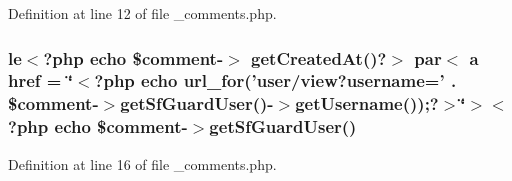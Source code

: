 Definition at line 12 of file \-\_\-comments.\-php.

\hypertarget{live_2modules_2comment_2templates_2__comments_8php_a4dd7f607c7b5683f1ebb8f4b4260ec6d}{
\subsubsection[{get\-Created\-At}]{\setlength{\rightskip}{0pt plus 5cm}le$<$?php echo \$comment-\/$>$ get\-Created\-At()?$>$ par$<$ a href = \char`\"{}$<$?php echo url\-\_\-for('user/view?username=' . \$comment-\/$>$get\-Sf\-Guard\-User()-\/$>$get\-Username());?$>$\char`\"{}$>$$<$?php echo \$comment-\/$>$get\-Sf\-Guard\-User()}}\label{live_2modules_2comment_2templates_2__comments_8php_a4dd7f607c7b5683f1ebb8f4b4260ec6d}


Definition at line 16 of file \-\_\-comments.\-php.

